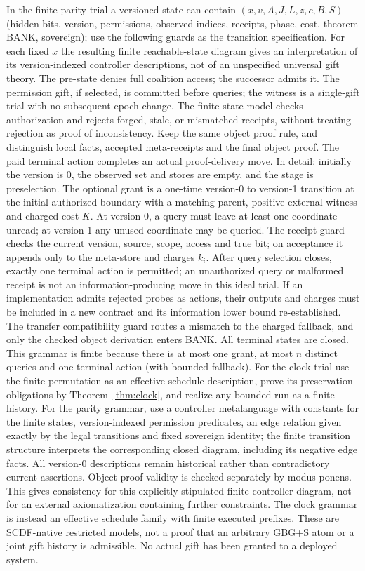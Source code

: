 \documentclass[11pt,letterpaper]{article}
\begin{document}
In the finite parity trial a versioned state can contain $(x,v,A,J,L,z,c,B,S)$ (hidden bits, version, permissions, observed indices, receipts, phase, cost, theorem BANK, sovereign); use the following guards as the transition specification. For each fixed $x$ the resulting finite reachable-state diagram gives an interpretation of its version-indexed controller descriptions, not of an unspecified universal gift theory. The pre-state denies full coalition access; the successor admits it. The permission gift, if selected, is committed before queries; the witness is a single-gift trial with no subsequent epoch change. The finite-state model checks authorization and rejects forged, stale, or mismatched receipts, without treating rejection as proof of inconsistency. Keep the same object proof rule, and distinguish local facts, accepted meta-receipts and the final object proof. The paid terminal action completes an actual proof-delivery move. In detail: initially the version is 0, the observed set and stores are empty, and the stage is preselection. The optional grant is a one-time version-0 to version-1 transition at the initial authorized boundary with a matching parent, positive external witness and charged cost $K$. At version 0, a query must leave at least one coordinate unread; at version 1 any unused coordinate may be queried. The receipt guard checks the current version, source, scope, access and true bit; on acceptance it appends only to the meta-store and charges $k_i$. After query selection closes, exactly one terminal action is permitted; an unauthorized query or malformed receipt is not an information-producing move in this ideal trial. If an implementation admits rejected probes as actions, their outputs and charges must be included in a new contract and its information lower bound re-established. The transfer compatibility guard routes a mismatch to the charged fallback, and only the checked object derivation enters BANK. All terminal states are closed. This grammar is finite because there is at most one grant, at most $n$ distinct queries and one terminal action (with bounded fallback). For the clock trial use the finite permutation as an effective schedule description, prove its preservation obligations by Theorem~\ref{thm:clock}, and realize any bounded run as a finite history. For the parity grammar, use a controller metalanguage with constants for the finite states, version-indexed permission predicates, an edge relation given exactly by the legal transitions and fixed sovereign identity; the finite transition structure interprets the corresponding closed diagram, including its negative edge facts. All version-0 descriptions remain historical rather than contradictory current assertions. Object proof validity is checked separately by modus ponens. This gives consistency for this explicitly stipulated finite controller diagram, not for an external axiomatization containing further constraints. The clock grammar is instead an effective schedule family with finite executed prefixes. These are SCDF-native restricted models, not a proof that an arbitrary GBG+S atom or a joint gift history is admissible. No actual gift has been granted to a deployed system.
\end{document}
